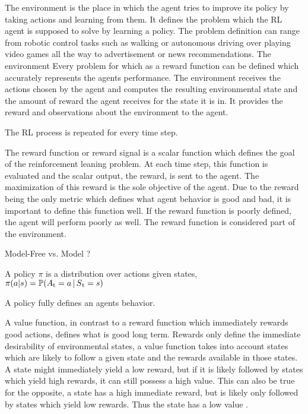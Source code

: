 The environment is the place in which the agent tries to improve its policy by taking actions and learning from them.
It defines the problem which the RL agent is supposed to solve by learning a policy.
The problem definition can range from robotic control tasks such as walking or autonomous driving over playing video games all the way to advertisement or news recommendations.
The environment 
Every problem for which as a reward function can be defined which accurately represents the agents performance.
The environment receives the actions chosen by the agent and computes the resulting environmental state and the amount of reward the agent receives for the state it is in.
It provides the reward and observations about the environment to the agent.

The RL process is repeated for every time step.

The reward function or reward signal is a scalar function which defines the goal of the reinforcement leaning problem.
At each time step, this function is evaluated and the scalar output, the reward, is sent to the agent.
The maximization of this reward is the sole objective of the agent.
Due to the reward being the only metric which defines what agent behavior is good and bad, it is important to define this function well.
If the reward function is poorly defined, the agent will perform poorly as well.
The reward function is considered part of the environment.
\parencite{sutton2018reinforcement}



\parencite{weng2018bandit}
\parencite{sutton2018reinforcement}

Model-Free vs. Model ?


\begin{definition*}
	A policy $\pi$ is a distribution over actions given states,\\
	$\pi(a|s) = \mathbb{P}(A\textsubscript{t} = a\,|\,S\textsubscript{t} = s)$
\end{definition*}
A policy fully defines an agents behavior. 

A value function, in contrast to a reward function which immediately rewards good actions, defines what is good long term. 
Rewards only define the immediate desirability of environmental states, a value function takes into account states which are likely to follow a given state and the rewards available in those states.
A state might immediately yield a low reward, but if it is likely followed by states which yield high rewards, it can still possess a high value.
This can also be true for the opposite, a state has a high immediate reward, but is likely only followed by states which yield low rewards. Thus the state has a low value \parencite{sutton2018reinforcement}.

